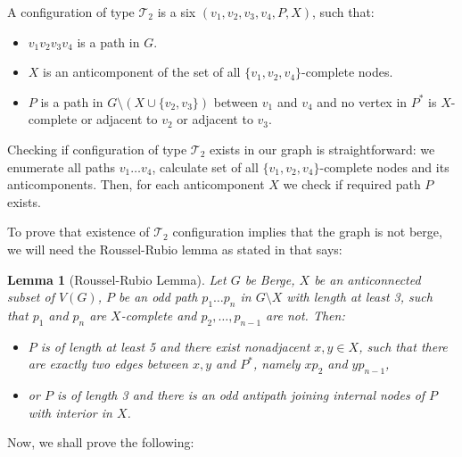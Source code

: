\documentclass{article}
\newtheorem{lemma}[theorem]{Lemma}
\newcommand\T{\mathcal{T}}
\begin{document}
A configuration of type $\T_2$ is a six $(v_1, v_2, v_3, v_4, P, X)$, such that:
\begin{itemize}
	\item $v_1v_2v_3v_4$ is a path in $G$.
	\item $X$ is an anticomponent of the set of all $\{v_1, v_2, v_4\}$-complete nodes.
	\item $P$ is a path in $G\setminus(X \cup \{v_2, v_3\})$ between $v_1$ and $v_4$ and no vertex in $P^*$ is $X$-complete or adjacent to $v_2$ or adjacent to $v_3$.
\end{itemize}

Checking if configuration of type $\T_2$ exists in our graph is straightforward: we enumerate all paths $v_1\ldots v_4$, calculate set of all $\{v_1, v_2, v_4\}$-complete nodes and its anticomponents. Then, for each anticomponent $X$ we check if required path $P$ exists.

To prove that existence of $\T_2$ configuration implies that the graph is not berge, we will need the Roussel-Rubio lemma \cite{RR01} as stated in \cite{MC05} that says:

\begin{lemma}[Roussel-Rubio Lemma]\label{Roussel-Rubio}
	Let $G$ be Berge, $X$ be an anticonnected subset of $V(G)$, $P$ be an odd path $p_1\ldots p_n$ in $G\setminus X$ with length at least 3, such that $p_1$ and $p_n$ are $X$-complete and $p_2, \ldots, p_{n-1}$ are not. Then:
	\begin{itemize}
		\item $P$ is of length at least 5 and there exist nonadjacent $x, y \in X$, such that there are exactly two edges between $x, y$ and $P^*$, namely $xp_2$ and $yp_{n-1}$,
		\item or $P$ is of length 3 and there is an odd antipath joining internal nodes of $P$ with interior in $X$.
	\end{itemize}
\end{lemma}

Now, we shall prove the following:
\end{document}
